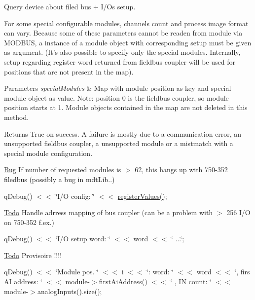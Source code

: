 Query device about filed bus + I/Os setup. 

For some special configurable modules, channels count and process image format can vary. Because some of these parameters cannot be readen from module via MODBUS, a instance of a module object with corresponding setup must be given as argument. (It's also possible to specify only the special modules. Internally, setup regarding register word returned from fieldbus coupler will be used for positions that are not present in the map).


\begin{DoxyParams}{Parameters}
{\em specialModules} & Map with module position as key and special module object as value. Note: position 0 is the fieldbus coupler, so module position starts at 1. Module objects contained in the map are not deleted in this method. \\
\hline
\end{DoxyParams}
\begin{DoxyReturn}{Returns}
True on success. A failure is mostly due to a communication error, an unsupported fieldbus coupler, a unsupported module or a mistmatch with a special module configuration. 
\end{DoxyReturn}


\begin{Desc}
\item[\hyperlink{bug__bug000001}{Bug}]If number of requested modules is $>$ 62, this hangs up with 750-\/352 filedbus (possibly a bug in mdtLib..) \end{Desc}


qDebug() $<$$<$ \char`\"{}I/O config: \char`\"{} $<$$<$ \hyperlink{classmdt_device_modbus_a83cb2a28111653fbcbbe748f7a1a2e3d}{registerValues()};

\begin{Desc}
\item[\hyperlink{todo__todo000012}{Todo}]Handle adrress mapping of bus coupler (can be a problem with $>$ 256 I/O on 750-\/352 f.ex.) \end{Desc}


qDebug() $<$$<$ \char`\"{}I/O setup word: \char`\"{} $<$$<$ word $<$$<$ \char`\"{} ...\char`\"{};

\begin{Desc}
\item[\hyperlink{todo__todo000013}{Todo}]Provisoire !!!! \end{Desc}


qDebug() $<$$<$ \char`\"{}Module pos. \char`\"{} $<$$<$ i $<$$<$ \char`\"{}: word: \char`\"{} $<$$<$ word $<$$<$ \char`\"{}, firs AI address: \char`\"{} $<$$<$ module-\/$>$firstAiAddress() $<$$<$ \char`\"{} , IN count: \char`\"{} $<$$<$ module-\/$>$analogInputs().size(); 




